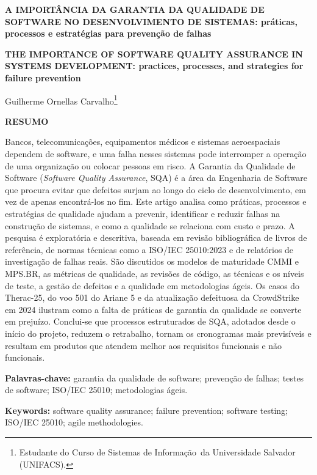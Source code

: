 \documentclass[12pt,a4paper]{article}
\newcommand{\autor}{Guilherme Ornellas Carvalho}
\newcommand{\cursonome}{Curso de Sistemas de Informação}
\begin{document}
\begin{center}
{\bfseries A IMPORTÂNCIA DA GARANTIA DA QUALIDADE DE SOFTWARE NO DESENVOLVIMENTO DE SISTEMAS: práticas, processos e estratégias para prevenção de falhas}

\vspace{0.5cm}
{\bfseries THE IMPORTANCE OF SOFTWARE QUALITY ASSURANCE IN SYSTEMS DEVELOPMENT: practices, processes, and strategies for failure prevention}

\vspace{0.8cm}
\autor\footnote{Estudante do \cursonome\ da Universidade Salvador (UNIFACS).}
\end{center}

\vspace{0.5cm}

\begin{singlespace}
\noindent\textbf{RESUMO}

\noindent Bancos, telecomunicações, equipamentos médicos e sistemas aeroespaciais dependem de software, e uma falha nesses sistemas pode interromper a operação de uma organização ou colocar pessoas em risco. A Garantia da Qualidade de Software (\textit{Software Quality Assurance}, SQA) é a área da Engenharia de Software que procura evitar que defeitos surjam ao longo do ciclo de desenvolvimento, em vez de apenas encontrá-los no fim. Este artigo analisa como práticas, processos e estratégias de qualidade ajudam a prevenir, identificar e reduzir falhas na construção de sistemas, e como a qualidade se relaciona com custo e prazo. A pesquisa é exploratória e descritiva, baseada em revisão bibliográfica de livros de referência, de normas técnicas como a ISO/IEC 25010:2023 e de relatórios de investigação de falhas reais. São discutidos os modelos de maturidade CMMI e MPS.BR, as métricas de qualidade, as revisões de código, as técnicas e os níveis de teste, a gestão de defeitos e a qualidade em metodologias ágeis. Os casos do Therac-25, do voo 501 do Ariane 5 e da atualização defeituosa da CrowdStrike em 2024 ilustram como a falta de práticas de garantia da qualidade se converte em prejuízo. Conclui-se que processos estruturados de SQA, adotados desde o início do projeto, reduzem o retrabalho, tornam os cronogramas mais previsíveis e resultam em produtos que atendem melhor aos requisitos funcionais e não funcionais.

\vspace{0.3cm}
\noindent\textbf{Palavras-chave:} garantia da qualidade de software; prevenção de falhas; testes de software; ISO/IEC 25010; metodologias ágeis.

\vspace{0.3cm}
\noindent\textbf{Keywords:} software quality assurance; failure prevention; software testing; ISO/IEC 25010; agile methodologies.
\end{singlespace}
\end{document}
